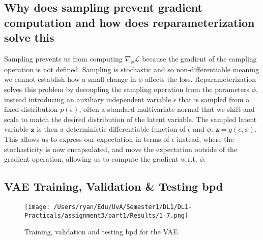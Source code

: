 \documentclass[a4paper]{article}
\begin{document}
\subsection{Why does sampling prevent gradient computation and how does reparameterization solve this}
Sampling prevents us from computing $\nabla_{\phi}\mathcal{L} $ because the gradient of the sampling operation is not defined. Sampling
is stochastic and so non-differentiable meaning we cannot establish how a small change in $\phi$ affects the loss.\newline
Reparameterization solves this problem by decoupling the sampling operation from the parameters $\phi$, instead introducing an auxiliary
independent variable $\epsilon$ that is sampled from a fixed distribution $p(\epsilon)$, often a standard multivariate normal that we
shift and scale to match the desired distribution of the latent variable. The sampled latent variable $\bm{z}$ is then a deterministic
differentiable function of $\epsilon$ and $\phi$: $\bm{z} = g(\epsilon, \phi)$. This allows us to express our expectation in terms of
$\epsilon$ instead, where the stochasticity is now encapsulated, and move the expectation outside of the gradient operation, allowing us
to compute the gradient w.r.t. $\phi$.

\subsection{VAE Training, Validation \& Testing bpd}
\begin{figure}[H]
    \centering
    \texttt{[image: /Users/ryan/Edu/UvA/Semester1/DL1/DL1-Practicals/assignment3/part1/Results/1-7.png]}
    \caption{Training, validation and testing bpd for the VAE}
    \label{fig:VAE_training}
\end{figure}
\end{document}
